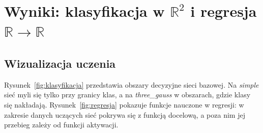 \documentclass{article}
\begin{document}
\begin{table}[htbp]
\centering
{}
\caption{Konfiguracja bazowa części pierwszej. Każde badanie zmienia jeden z czynników,
pozostałe pozostają bez zmian.}
\label{tab:baseline}
\end{table}

\section{Wyniki: klasyfikacja w $\mathbb{R}^2$ i regresja $\mathbb{R}\to\mathbb{R}$}
\label{sec:wyniki}

\subsection{Wizualizacja uczenia}

Rysunek~\ref{fig:klasyfikacja} przedstawia obszary decyzyjne sieci bazowej. Na \emph{simple} sieć
myli się tylko przy granicy klas, a na \emph{three\_gauss} w obszarach, gdzie klasy się nakładają.
Rysunek~\ref{fig:regresja} pokazuje funkcje nauczone w regresji: w zakresie danych uczących sieć
pokrywa się z funkcją docelową, a poza nim jej przebieg zależy od funkcji aktywacji.
\end{document}
